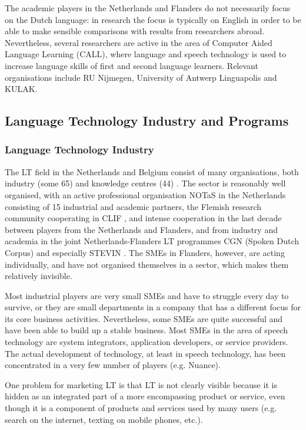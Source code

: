 \begin{multicols}{2}
    The academic players in the Netherlands and Flanders do not necessarily focus on the Dutch language: in research the focus is typically on English in order to be able to make sensible comparisons with results from researchers abroad. Nevertheless, several researchers are active in the area of Computer Aided Language Learning (CALL), where language and speech technology is used to increase language skills of first and second language learners. Relevant organisations include RU Nijmegen, University of Antwerp Linguapolis and KULAK.

\subsection{Language Technology Industry and Programs}

  \subsubsection{Language Technology Industry}

 The LT field in the Netherlands and Belgium consist of many organisations, both industry (some 65) and knowledge centres (44) \cite{Orgs}.  The sector is reasonably well organised, with an active professional organisation NOTaS \cite{NOTAS} in the Netherlands consisting of 15 industrial and academic partners, the Flemish research community cooperating in CLIF \cite{CLIF}, and intense cooperation in the last decade between players from the Netherlands and Flanders, and from industry and academia in the joint Netherlands-Flanders LT programmes CGN (Spoken Dutch Corpus) \cite{CGN} and especially STEVIN \cite{STEVIN}. The SMEs in Flanders, however, are acting individually, and have not organised themselves in a sector, which makes them relatively invisible.

    Most industrial players are very small SMEs and have to struggle every day to survive, or they are small departments in a company that has a different focus for its core business activities. Nevertheless, some SMEs are quite successful and have been able to build up a stable business. Most SMEs in the area of speech technology are system integrators, application developers, or service providers. The actual development of technology, at least in speech technology, has been concentrated in a very few number of players (e.g. Nuance).

    One problem for marketing LT is that LT is not clearly visible because it is hidden as an integrated part of a more encompassing product or service, even though it is a component of products and services used by many users (e.g. search on the internet, texting on mobile phones, etc.).


\end{multicols}
